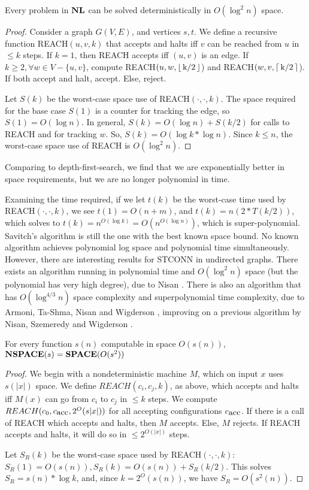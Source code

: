 \begin{Thm}
Every problem in $\nl$ can be solved deterministically in $O(\log^{2}{n})$ space.
\end{Thm}
\begin{proof}
    Consider a graph $G(V,E)$, and vertices $s, t$. We define a
    recursive function REACH$(u,v,k)$ that accepts and halts iff $v$
    can be reached from $u$ in $\leq k$ steps. If $k = 1$, then REACH
    accepts iff $(u,v)$ is an edge. If $k \geq 2 , \forall w \in V-
    \{u, v\}$, compute REACH$(u,w, \floor{k/2}$) and REACH$(w,v,
    \ceil{k/2}$). If both accept and halt, accept.  Else, reject.
    
    Let $S(k)$ be the worst-case space use of REACH$(\cdot,\cdot,k)$.
    The space required for the base case $S(1)$ is a counter for
    tracking the edge, so $S(1) = O(\log n)$. 
    In general, $S(k) = O(\log n ) + S(k/2)$ for
    calls to REACH and for tracking $w$.  So, $S(k) = O(\log{k}
    *\log{n})$. Since $ k \leq n$, the worst-case space use
    of REACH is $O(\log^2{n})$.
\end{proof}

Comparing to depth-first-search, we find that we are exponentially
better in space requirements, but we are no longer polynomial in time.

Examining the time required, if we let $t(k)$ be
the worst-case time used by REACH$(\cdot,\cdot,k)$,
we see $t(1) = O(n +m)$, and $t(k) =
n(2*T(k/2))$, which solves to $t(k) = n^{O(\log{k})} = O(n^{O(\log{n})})$, 
which is
super-polynomial.  Savitch's algorithm is still the one with the
 best known space
bound. No known algorithm achieves polynomial log space and polynomial
time simultaneously. However, there are interesting results for STCONN
in undirected graphs. There exists an algorithm running in polynomial
time and $O(\log^{2}{n})$ space (but the polynomial has very high
degree), due to Nisan \cite{N94}. 
There is also an algorithm that has  $O(\log^{4/3}{n})$ space
complexity and superpolynomial time complexity, due to
Armoni, Ta-Shma, Nisan and Wigderson \cite{ATWZ97}, improving
on a previous algorithm by Nisan, Szemeredy and Wigderson \cite{NSW92}.

 
\begin{Thm} For every function $s(n)$ computable
in space $O(s(n))$,
$\nspace(s) = \dspace(O(s^2))$
\end{Thm}

\begin{proof}
We begin with a nondeterministic machine $M$, which on input $x$ uses
$s(|x|)$ space. We define $REACH (c_i, c_j, k)$, as above, which accepts
and halts iff $M(x)$ can go from $c_i$ to $c_j$ in $\leq k$ steps.  We
compute $REACH(c_0, c_{\hbox{acc}}, 2^O(s|x|))$ for all accepting
configurations $c_{\hbox{acc}}$.  
If there is a call of REACH which accepts and halts,
then $M$ accepts. Else, $M$ rejects.  If REACH accepts and halts,
it will do so in $\leq 2^{O(|x|)}$ steps.

Let $S_R(k)$ be the worst-case space used by  REACH$(\cdot,\cdot,k)$:
$S_R(1) = O(s(n)), S_R(k) = O(s(n) ) + S_R(k/2)$. This solves
$S_R =s(n)* \log{k }$, and, since $k = 2^O(s(n))$,
we have $S_R = O(s^2(n))$.
\end {proof}

